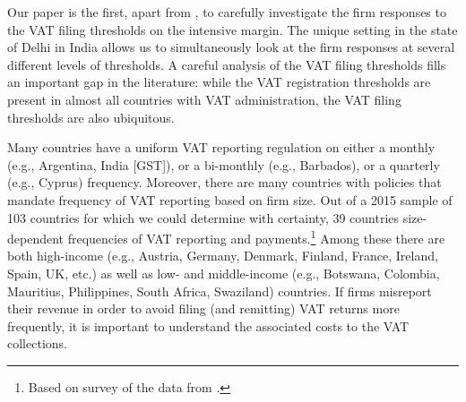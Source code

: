 Our paper is the first, apart from \citet{asatryan2017responses}, to carefully investigate the firm responses to the VAT filing thresholds on the intensive margin. The unique setting in the state of Delhi in India allows us to simultaneously look at the firm responses at several different levels of thresholds. A careful analysis of the VAT filing thresholds fills an important gap in the literature: while the VAT registration thresholds are present in almost all countries with VAT administration, the VAT filing thresholds are also ubiquitous. 

Many countries have a uniform VAT reporting regulation on either a monthly (e.g., Argentina, India [GST]), or a bi-monthly (e.g., Barbados), or a quarterly (e.g., Cyprus) frequency. Moreover, there are many countries with policies that mandate frequency of VAT reporting based on firm size. Out of a 2015 sample of 103 countries for which we could determine with certainty, 39 countries size-dependent frequencies of VAT reporting and payments.\footnote{Based on survey of the data from \citet{ey2015worldwideguide}.} Among these there are both high-income (e.g., Austria, Germany, Denmark, Finland, France, Ireland, Spain, UK, etc.) as well as low- and middle-income (e.g., Botswana, Colombia, Mauritius, Philippines, South Africa, Swaziland) countries. If firms misreport their revenue in order to avoid filing (and remitting) VAT returns more frequently, it is important to understand the associated costs to the VAT collections. 
% 

